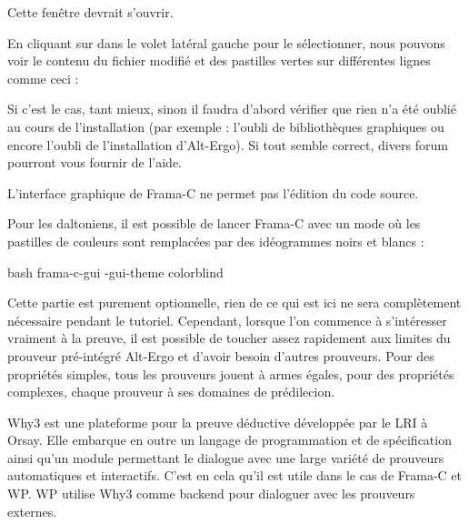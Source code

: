Cette fenêtre devrait s'ouvrir.





En cliquant sur  dans le volet latéral gauche pour le sélectionner,
nous pouvons voir le contenu du fichier  modifié et des pastilles 
vertes sur différentes lignes comme ceci :





Si c'est le cas, tant mieux, sinon il faudra d'abord vérifier que rien n'a été
oublié au cours de l'installation (par exemple : l'oubli de bibliothèques graphiques
ou encore l'oubli de l'installation d'Alt-Ergo). Si tout semble correct, divers forum
pourront vous fournir de l'aide.



\begin{Warning}
L'interface graphique de Frama-C ne permet pas l'édition du code source.
\end{Warning}


\begin{Information}
Pour les daltoniens, il est possible de lancer Frama-C avec un mode où les 
pastilles de couleurs sont remplacées par des idéogrammes noirs et blancs :

\begin{CodeBlock}{bash}
frama-c-gui -gui-theme colorblind
\end{CodeBlock}
\end{Information}




Cette partie est purement optionnelle, rien de ce qui est ici ne sera 
complètement nécessaire pendant le tutoriel. Cependant, lorsque l'on commence à 
s'intéresser vraiment à la preuve, il est possible de toucher assez rapidement
aux limites du prouveur pré-intégré Alt-Ergo et d'avoir besoin d'autres
prouveurs. Pour des propriétés simples, tous les prouveurs jouent à armes
égales, pour des propriétés complexes, chaque prouveur à ses domaines de
prédilecion.



Why3 est une plateforme pour la preuve déductive développée par le LRI à Orsay. 
Elle embarque en outre un langage de programmation et de spécification ainsi 
qu'un module permettant le dialogue avec une large variété de prouveurs 
automatiques et interactifs. C'est en cela qu'il est utile dans le cas de
Frama-C et WP. WP utilise Why3 comme backend pour dialoguer avec les prouveurs
externes.


